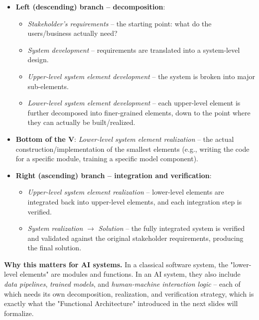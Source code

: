 \begin{itemize}
    \item \textbf{Left (descending) branch -- decomposition}:
    \begin{itemize}
        \item \emph{Stakeholder's requirements} -- the starting point: what do the users/business actually need?
        \item \emph{System development} -- requirements are translated into a system-level design.
        \item \emph{Upper-level system element development} -- the system is broken into major sub-elements.
        \item \emph{Lower-level system element development} -- each upper-level element is further decomposed into finer-grained elements, down to the point where they can actually be built/realized.
    \end{itemize}
    \vspace{0.2cm}
    \item \textbf{Bottom of the V}: \emph{Lower-level system element realization} -- the actual construction/implementation of the smallest elements (e.g., writing the code for a specific module, training a specific model component).
    \vspace{0.4cm}
    \item \textbf{Right (ascending) branch -- integration and verification}:
    \begin{itemize}
        \item \emph{Upper-level system element realization} -- lower-level elements are integrated back into upper-level elements, and each integration step is verified.
        \item \emph{System realization} $\rightarrow$ \emph{Solution} -- the fully integrated system is verified and validated against the original stakeholder requirements, producing the final solution.
    \end{itemize}
\end{itemize}



\textbf{Why this matters for AI systems.} In a classical software system, the "lower-level elements" are modules and functions. In an AI system, they also include \emph{data pipelines}, \emph{trained models}, and \emph{human-machine interaction logic} -- each of which needs its own decomposition, realization, and verification strategy, which is exactly what the "Functional Architecture" introduced in the next slides will formalize.

